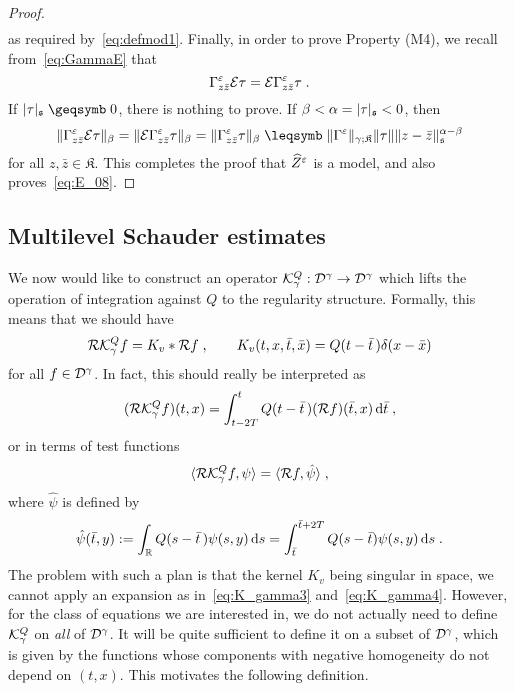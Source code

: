\documentclass[reqno,11pt]{article}
\def\fraks{\mathfrak{s}}
\def\fraK{\mathfrak{K}}
\def\Zhat{\widehat Z}
\begin{document}
\begin{proof}
\begin{align*}
\end{align*}
as required by~\eqref{eq:defmod1}. 
%
Finally, in order to prove Property (M4), we recall from~\eqref{eq:GammaE} that 
\[
\Gamma^\varepsilon_{z\bar z}{\mathcal E}\tau 
= {\mathcal E}\Gamma^\varepsilon_{z\bar z}\tau\;.
\]
If $\abs{\tau}_\fraks\geqs 0$, there is nothing to prove. If $\beta< \alpha =
\abs{\tau}_\fraks < 0$, then 
\[
 \norm{\Gamma^\eps_{z\bar z}\cE\tau}_\beta 
 = \norm{\cE\Gamma^\eps_{z\bar z}\tau}_\beta 
 = \norm{\Gamma^\eps_{z\bar z}\tau}_\beta
 \leqs \norm{\Gamma^\eps}_{\gamma;\fraK}\norm{\tau}\norm{z-\bar
z}^{\alpha-\beta}_\fraks
\]
for all $z, \bar z\in\fraK$. This completes the proof that $\Zhat^\eps$ is a
model, and also proves~\eqref{eq:E_08}. 
\end{proof}




\subsection{Multilevel Schauder estimates}
\label{ssec_Schauder}

We now would like to construct an operator ${\mathcal K}^Q_\gamma: {\mathcal D}^\gamma \to
{\mathcal D}^\gamma$ which lifts the operation of integration against $Q$ to the
regularity structure. Formally, this means that we should have 
\begin{equation}
 \label{eq:fix_t03}
 \cR\cK^Q_\gamma f = K_v * \cR f\;,
 \qquad
 K_v(t,x,\bar t,\bar x) = Q(t-\bar t\,)\delta(x-\bar x) 
\end{equation} 
for all $f\in{\mathcal D}^\gamma$. In fact, this should really be interpreted as 
\begin{equation}
 \label{eq:fix_t03a}
 (\cR\cK^Q_\gamma f)(t,x) = \int_{t-2T}^t Q(t-\bar t\,) (\cR f)(\bar t,x)
\6\bar t\;, 
\end{equation} 
or in terms of test functions  
\begin{equation}
 \label{eq:fix_t03b}
 \pscal{\cR\cK^Q_\gamma f}{\psi} = \pscal{\cR f}{\hat\psi}\;,
\end{equation} 
where $\hat\psi$ is defined by 
\begin{equation}
 \label{eq:ext04}
 \hat\psi(\bar t,y) := \int_\R Q(s-\bar t\,) \psi(s,y)\6s
= \int_{\bar t\,}^{\bar t+2T} Q(s-\bar t) \psi(s,y)\6s\;.
\end{equation} 
The problem with such a plan is that the kernel $K_v$ being singular in space,
we cannot apply an expansion as in~\eqref{eq:K_gamma3} and~\eqref{eq:K_gamma4}.
However, for the class
of equations we are interested in, we do not actually need to define
${\mathcal K}^Q_\gamma$ on \emph{all} of ${\mathcal D}^\gamma$. It will be quite sufficient to
define it on a subset of ${\mathcal D}^\gamma$, which is given by the functions whose
components with negative homogeneity do not depend on $(t,x)$. This motivates
the following definition.
\end{document}
